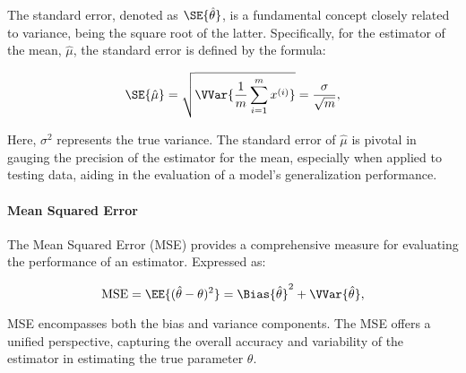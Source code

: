             The standard error, denoted as $\SE{\hat{\theta}}$, is a fundamental concept closely related to variance, being the square root of the latter. Specifically, for the estimator of the mean, $\hat{\mu}$, the standard error is defined by the formula:

            \begin{equation}
                \SE{\hat{\mu}} = \sqrt{\VVar{\frac{1}{m}\sum_{i=1}^m x^{(i)}}} = \frac{\sigma}{\sqrt{m}},
            \end{equation}

            Here, $\sigma^2$ represents the true variance. The standard error of $\hat{\mu}$ is pivotal in gauging the precision of the estimator for the mean, especially when applied to testing data, aiding in the evaluation of a model's generalization performance.

        \paragraph{Mean Squared Error}

            The Mean Squared Error (MSE) provides a comprehensive measure for evaluating the performance of an estimator. Expressed as:

            \begin{equation}
                \text{MSE} = \EE{(\hat{\theta}-\theta)^2} = \Bias{\hat{\theta}}^2 + \VVar{\hat{\theta}},
            \end{equation}

            MSE encompasses both the bias and variance components. The MSE offers a unified perspective, capturing the overall accuracy and variability of the estimator in estimating the true parameter $\theta$.


    \subsection{}
            
    \subsection{}
    \subsection{}
    \subsection{}
